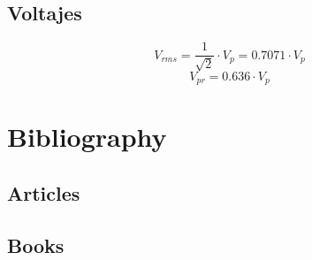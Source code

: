 \documentclass[
	12pt, %
	fleqn, %
	a4paper, %
	oneside, %
]{LegrandOrangeBook}
\begin{document}
\section{Voltajes}
\begin{center}
\end{center}
\begin{equation}
V_{rms}=\frac{1}{\sqrt{2}}\cdot V_p=0.7071\cdot V_p
\label{eq:vrms}
\end{equation}
\begin{equation}
V_{pr}=0.636\cdot V_p
\label{eq:vprom}
\end{equation}
\stopcontents[part] %


\chapterspaceabove{6.75cm} %
\chapterspacebelow{7.25cm} %

\chapter*{Bibliography}

\section*{Articles}


\section*{Books}
\end{document}
